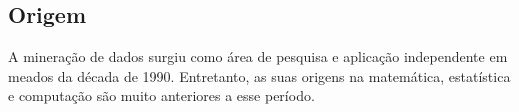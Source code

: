 \subsection*{Origem}
A mineração de dados surgiu como área de pesquisa e aplicação independente em meados da década de 1990.
Entretanto, as suas origens na matemática, estatística e computação são muito anteriores a esse período.
